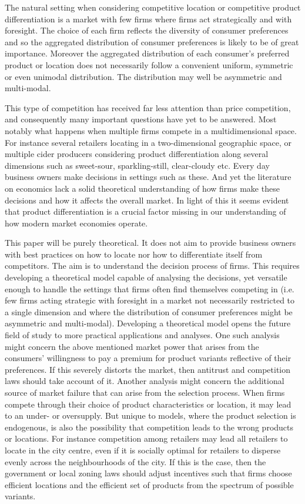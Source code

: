 \documentclass[preprint, 12pt]{elsarticle}
\begin{document}
The natural setting when considering competitive location or competitive product differentiation is a market with few firms where firms act strategically and with foresight. The choice of each firm reflects the diversity of consumer preferences and so the aggregated distribution of consumer preferences is likely to be of great importance. Moreover the aggregated distribution of each consumer's preferred product or location does not necessarily follow a convenient uniform, symmetric or even unimodal distribution. The distribution may well be asymmetric and multi-modal.

This type of competition has received far less attention than price competition, and consequently many important questions have yet to be answered. Most notably what happens when multiple firms compete in a multidimensional space. For instance several retailers locating in a two-dimensional geographic space, or multiple cider producers considering product differentiation along several dimensions such as sweet-sour, sparkling-still, clear-cloudy etc. Every day business owners make decisions in settings such as these. And yet the literature on economics lack a solid theoretical understanding of how firms make these decisions and how it affects the overall market. In light of this it seems evident that product differentiation is a crucial factor missing in our understanding of how modern market economies operate.

This paper will be purely theoretical. It does not aim to provide business owners with best practices on how to locate nor how to differentiate itself from competitors. The aim is to understand the decision process of firms. This requires developing a theoretical model capable of analysing the decisions, yet versatile enough to handle the settings that firms often find themselves competing in (i.e. few firms acting strategic with foresight in a market not necessarily restricted to a single dimension and where the distribution of consumer preferences might be asymmetric and multi-modal). Developing a theoretical model opens the future field of study to more practical applications and analyses. One such analysis might concern the above mentioned market power that arises from the consumers' willingness to pay a premium for product variants reflective of their preferences. If this severely distorts the market, then antitrust and competition laws should take account of it. Another analysis might concern the additional source of market failure that can arise from the selection process. When firms compete through their choice of product characteristics or location, it may lead to an under- or oversupply. But unique to models, where the product selection is endogenous, is also the possibility that competition leads to the wrong products or locations. For instance competition among retailers may lead all retailers to locate in the city centre, even if it is socially optimal for retailers to disperse evenly across the neighbourhoods of the city. If this is the case, then the government or local zoning laws should adjust incentives such that firms choose efficient locations and the efficient set of products from the spectrum of possible variants.
\end{document}
